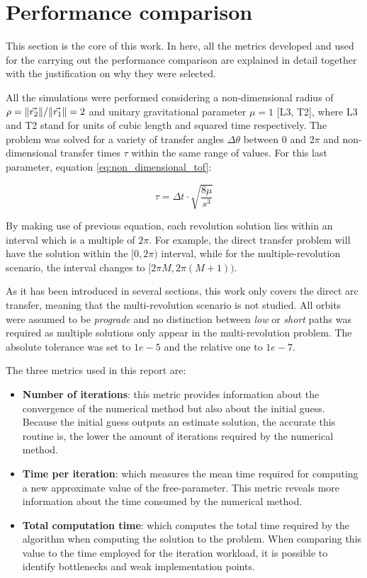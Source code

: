 \section{Performance comparison}
\label{sec:performance}

This section is the core of this work. In here, all the metrics developed and
used for the carrying out the performance comparison are explained in detail
together with the justification on why they were selected.

All the simulations were performed considering a non-dimensional radius of
$\rho=\lVert\vec{r_2}\rVert/\lVert\vec{r_1}\rVert=2$ and unitary gravitational parameter
$\mu=1$ [L3, T2], where L3 and T2 stand for units of cubic length and squared
time respectively. The problem was solved for a variety of transfer angles
$\Delta \theta$ between $0$ and $2\pi$ and non-dimensional transfer times $\tau$
within the same range of values. For this last parameter, equation
\ref{eq:non_dimensional_tof}:

\begin{equation}
  \tau =  \Delta t \cdot \sqrt{\frac{8\mu}{s^3}}
  \label{eq:non_dimensional_tof}
\end{equation}

By making use of previous equation, each revolution solution lies within an
interval which is a multiple of $2\pi$. For example, the direct transfer problem
will have the solution within the $[0, 2\pi)$ interval, while for the
multiple-revolution scenario, the interval changes to $[2\pi M, 2\pi(M+1))$.

As it has been introduced in several sections, this work only covers the direct
arc transfer, meaning that the multi-revolution scenario is not studied. All
orbits were assumed to be \textit{prograde} and no distinction between
\textit{low} or \textit{short} paths was required as multiple solutions only
appear in the multi-revolution problem. The absolute tolerance was set to $1e-5$
and the relative one to $1e-7$.

The three metrics used in this report are:

\begin{itemize}
  \item \textbf{Number of iterations}: this metric provides information about
        the convergence of the numerical method but also about the initial
        guess. Because the initial guess outputs an estimate solution, the
        accurate this routine is, the lower the amount of iterations required
        by the numerical method.
  \item \textbf{Time per iteration}: which measures the mean time required for
        computing a new approximate value of the free-parameter. This metric
        reveals more information about the time consumed by the numerical
        method.
  \item \textbf{Total computation time}: which computes the total time required
	by the algorithm when computing the solution to the problem. When
	comparing this value to the time employed for the iteration workload, it
	is possible to identify bottlenecks and weak implementation points.
\end{itemize}

